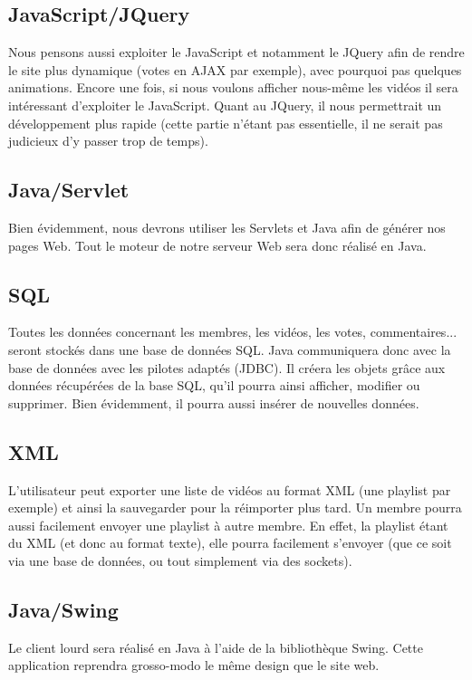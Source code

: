 \documentclass{article}
\begin{document}
\subsection{JavaScript/JQuery}
Nous pensons aussi exploiter le JavaScript et notamment le JQuery afin de rendre le site plus dynamique (votes en AJAX par exemple), avec pourquoi pas quelques animations. Encore une fois, si nous voulons afficher nous-même les vidéos il sera intéressant d'exploiter le JavaScript. Quant au JQuery, il nous permettrait un développement plus rapide (cette partie n'étant pas essentielle, il ne serait pas judicieux d'y passer trop de temps).

\subsection{Java/Servlet}
Bien évidemment, nous devrons utiliser les Servlets et Java afin de générer nos pages Web. Tout le moteur de notre serveur Web sera donc réalisé en Java.

\subsection{SQL}
Toutes les données concernant les membres, les vidéos, les votes, commentaires... seront stockés dans une base de données SQL. Java communiquera donc avec la base de données avec les pilotes adaptés (JDBC). Il créera les objets grâce aux données récupérées de la base SQL, qu'il pourra ainsi afficher, modifier ou supprimer. Bien évidemment, il pourra aussi insérer de nouvelles données.

\subsection{XML}
L'utilisateur peut exporter une liste de vidéos au format XML (une playlist par exemple) et ainsi la sauvegarder pour la réimporter plus tard. Un membre pourra aussi facilement envoyer une playlist à autre membre. En effet, la playlist étant du XML (et donc au format texte), elle pourra facilement s'envoyer (que ce soit via une base de données, ou tout simplement via des sockets).

\subsection{Java/Swing}
Le client lourd sera réalisé en Java à l'aide de la bibliothèque Swing. Cette application reprendra grosso-modo le même design que le site web.
\end{document}
